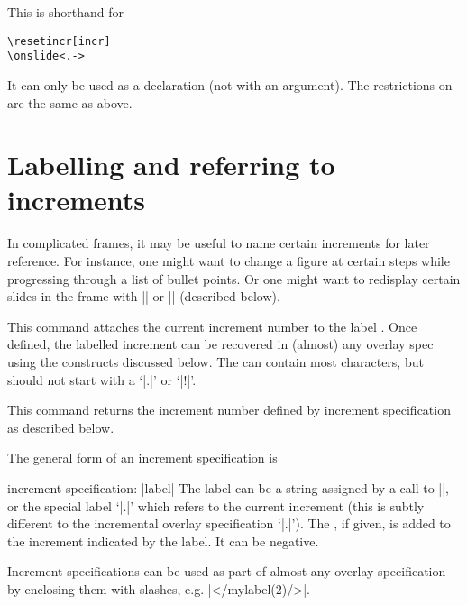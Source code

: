 \documentclass[a4paper]{ltxdoc}
\begin{document}
\begin{command}{\fromincr{}}
  This is shorthand for
\begin{verbatim}
\resetincr[incr]
\onslide<.->
\end{verbatim}
It can only be used as a declaration (not with an argument).  The restrictions
on  are the same as above.  
\end{command}


\section{Labelling and referring to increments}\label{sec:labels}

In complicated frames, it may be useful to name certain increments for later
reference.  For instance, one might want to change a figure at certain steps
while progressing through a list of bullet points.  Or one might want to
redisplay certain slides in the frame with |\afterframe| or |\handoutframe|
(described below).

\begin{command}{\incrlabel {}}
  This command attaches the current increment number to the label .
  Once defined, the labelled increment can be recovered in (almost) any overlay
  spec using the constructs discussed below.  The  can contain most
  characters, but should not start with a `|.|'  or `|!|'.
\end{command}

\begin{command}{\incrref {}}
  This command returns the increment number defined by increment specification
   as described below.
\end{command}

\noindent
The general form of an increment specification is
\begin{command}{{increment specification}: |label|}
  The label can be a string assigned by a call to |\incrlabel|, or the special
  label `|.|' which refers to the current increment (this is subtly different to
  the incremental overlay specification `|.|').  The , if given, is
  added to the increment indicated by the label.  It can be negative.

  Increment specifications can be used as part of almost any overlay
  specification by enclosing them with slashes, e.g. |</mylabel(2)/>|.
\end{command}
\end{document}
